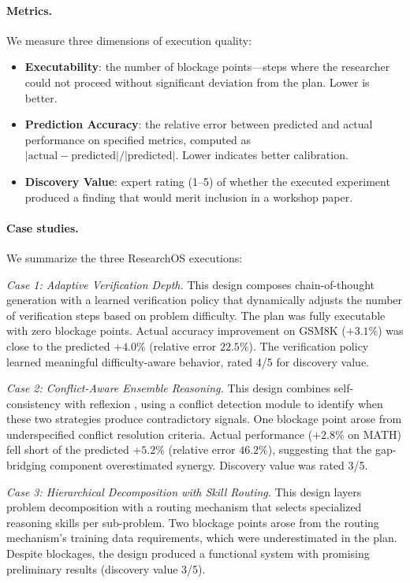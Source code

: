 \paragraph{Metrics.}
We measure three dimensions of execution quality:
\begin{itemize}[leftmargin=1.5em]
    \item \textbf{Executability}: the number of blockage points---steps where the researcher could not proceed without significant deviation from the plan. Lower is better.
    \item \textbf{Prediction Accuracy}: the relative error between predicted and actual performance on specified metrics, computed as $|\text{actual} - \text{predicted}|/|\text{predicted}|$. Lower indicates better calibration.
    \item \textbf{Discovery Value}: expert rating (1--5) of whether the executed experiment produced a finding that would merit inclusion in a workshop paper.
\end{itemize}

\paragraph{Case studies.}
We summarize the three ResearchOS executions:

\textit{Case 1: Adaptive Verification Depth.} This design composes chain-of-thought generation \cite{wei2022chain} with a learned verification policy that dynamically adjusts the number of verification steps based on problem difficulty. The plan was fully executable with zero blockage points. Actual accuracy improvement on GSM8K ($+3.1\%$) was close to the predicted $+4.0\%$ (relative error $22.5\%$). The verification policy learned meaningful difficulty-aware behavior, rated 4/5 for discovery value.

\textit{Case 2: Conflict-Aware Ensemble Reasoning.} This design combines self-consistency \cite{wang2023selfconsistency} with reflexion \cite{shinn2023reflexion}, using a conflict detection module to identify when these two strategies produce contradictory signals. One blockage point arose from underspecified conflict resolution criteria. Actual performance ($+2.8\%$ on MATH) fell short of the predicted $+5.2\%$ (relative error $46.2\%$), suggesting that the gap-bridging component overestimated synergy. Discovery value was rated 3/5.

\textit{Case 3: Hierarchical Decomposition with Skill Routing.} This design layers problem decomposition with a routing mechanism that selects specialized reasoning skills per sub-problem. Two blockage points arose from the routing mechanism's training data requirements, which were underestimated in the plan. Despite blockages, the design produced a functional system with promising preliminary results (discovery value 3/5).

